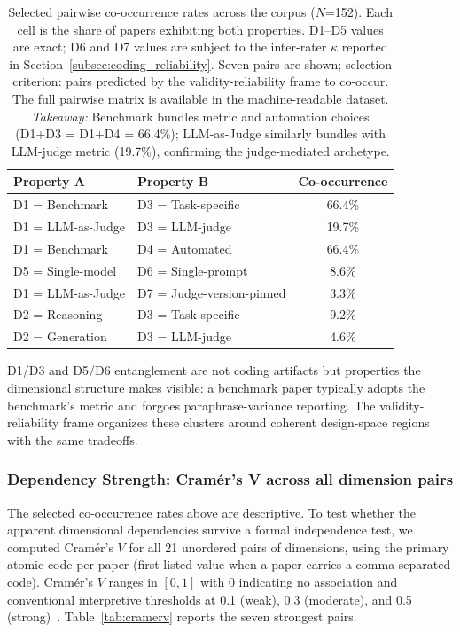 \documentclass[acmsmall, nonacm, screen]{acmart}
\begin{document}
\begin{table}[!htbp]
\renewcommand{\arraystretch}{1.2}
\caption{Selected pairwise co-occurrence rates across the corpus
($N$=152). Each cell is the share of papers exhibiting both
properties. D1--D5 values are exact; D6 and D7 values are subject to
the inter-rater $\kappa$ reported in Section~\ref{subsec:coding_reliability}.
Seven pairs are shown; selection criterion: pairs predicted by the
validity-reliability frame to co-occur. The full pairwise matrix is
available in the machine-readable dataset.
\textit{Takeaway:} Benchmark bundles metric and automation choices (D1+D3 = D1+D4 = 66.4\%); LLM-as-Judge similarly bundles with LLM-judge metric (19.7\%), confirming the judge-mediated archetype.}
\label{tab:cooccurrence}
\centering
\footnotesize
\begin{tabular}{p{3.5cm} p{3.5cm} c}
\toprule
\textbf{Property A} & \textbf{Property B} & \textbf{Co-occurrence} \\
\midrule
D1 = Benchmark & D3 = Task-specific & 66.4\% \\
D1 = LLM-as-Judge & D3 = LLM-judge & 19.7\% \\
D1 = Benchmark & D4 = Automated & 66.4\% \\
D5 = Single-model & D6 = Single-prompt & 8.6\% \\
D1 = LLM-as-Judge & D7 = Judge-version-pinned & 3.3\% \\
D2 = Reasoning & D3 = Task-specific & 9.2\% \\
D2 = Generation & D3 = LLM-judge & 4.6\% \\
\bottomrule
\end{tabular}
\end{table}

D1/D3 and D5/D6 entanglement are not coding artifacts but
properties the dimensional structure makes visible: a benchmark
paper typically adopts the benchmark's metric and forgoes
paraphrase-variance reporting. The validity-reliability frame
organizes these clusters around coherent design-space regions with
the same tradeoffs.

\subsubsection{Dependency Strength: Cram\'er's V across all dimension pairs}
\label{subsubsec:cramerv}

The selected co-occurrence rates above are descriptive. To test
whether the apparent dimensional dependencies survive a formal
independence test, we computed Cram\'er's $V$ for all 21
unordered pairs of dimensions, using the primary atomic code per
paper (first listed value when a paper carries a comma-separated
code). Cram\'er's $V$ ranges in $[0,1]$ with 0 indicating no
association and conventional interpretive thresholds at 0.1 (weak),
0.3 (moderate), and 0.5 (strong)~\cite{cramer1946methods}.
Table~\ref{tab:cramerv} reports the seven strongest pairs.
\end{document}
